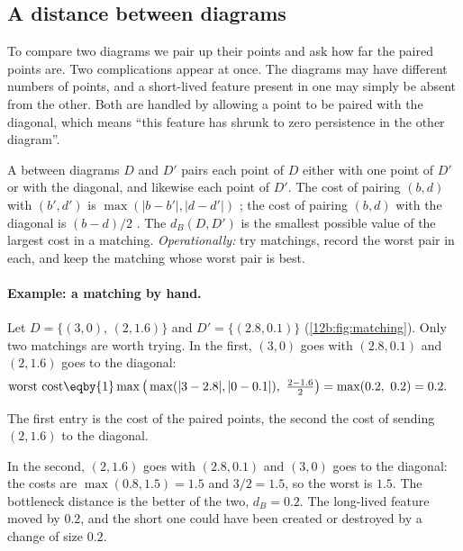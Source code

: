 \subsection{A distance between diagrams}
\label{12b:sec:bottleneck}

To compare two diagrams we pair up their points and ask how far the paired points are. Two complications
appear at once. The diagrams may have different numbers of points, and a short-lived feature present in one may
simply be absent from the other. Both are handled by allowing a point to be paired with the diagonal, which
means ``this feature has shrunk to zero persistence in the other diagram''.

\begin{workdef}
A  between diagrams $D$ and $D'$ pairs each point of $D$ either with one point of $D'$ or with
the diagonal, and likewise each point of $D'$. The cost of pairing $(b,d)$ with $(b',d')$ is
$\max(|b-b'|,|d-d'|)$ ; the cost of pairing
$(b,d)$ with the diagonal is $(b-d)/2$ . The  $d_B(D,D')$ is the smallest possible value of the
largest cost in a matching. \emph{Operationally:} try matchings, record the worst pair in each, and keep the
matching whose worst pair is best.
\end{workdef}

\paragraph{Example: a matching by hand.} Let $D=\{(3,0),\,(2,1.6)\}$ and $D'=\{(2.8,0.1)\}$
(\cref{12b:fig:matching}). Only two matchings are worth trying. In the first, $(3,0)$ goes with $(2.8,0.1)$ and
$(2,1.6)$ goes to the diagonal:
\begin{align*}
  \text{worst cost}
  &\eqby{1}\max\big(\max(|3-2.8|,|0-0.1|),\ \tfrac{2-1.6}{2}\big)
  = \max(0.2,\ 0.2)=0.2 .
\end{align*}
\begin{explain}
  \item The first entry is the cost of the paired points, the second the cost of sending $(2,1.6)$ to the diagonal.
\end{explain}
In the second, $(2,1.6)$ goes with $(2.8,0.1)$ and $(3,0)$ goes to the diagonal: the costs are
$\max(0.8,1.5)=1.5$ and $3/2=1.5$, so the worst is $1.5$. The bottleneck distance is the better of the two,
$d_B=0.2$. The long-lived feature moved by $0.2$, and the short one could have been created or destroyed
by a change of size $0.2$.

